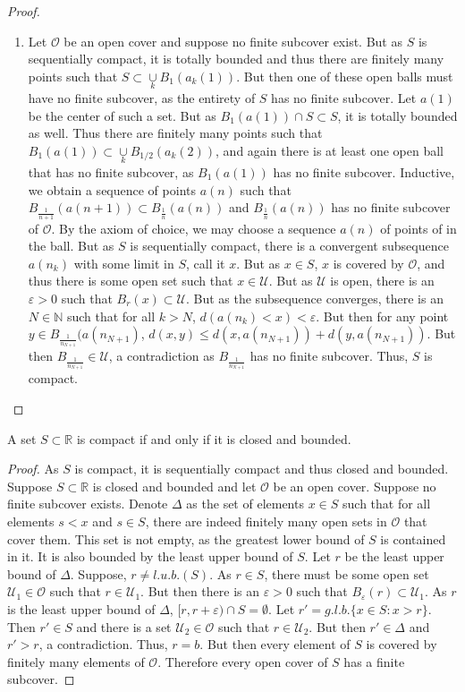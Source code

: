 \documentclass[crop=false,class=book]{standalone}
\begin{document}
\begin{proof}
\begin{enumerate}
\item Let $\mathcal{O}$ be an open cover and suppose no finite subcover exist. But as $S$ is sequentially compact, it is totally bounded and thus there are finitely many points such that $S\subset \underset{k}\cup B_{1}(a_k(1))$. But then one of these open balls must have no finite subcover, as the entirety of $S$ has no finite subcover. Let $a(1)$ be the center of such a set. But as $B_{1}(a(1))\cap S \subset S$, it is totally bounded as well. Thus there are finitely many points such that $B_{1}(a(1))\subset \underset{k}\cup B_{1/2}(a_k(2))$, and again there is at least one open ball that has no finite subcover, as $B_{1}(a(1))$ has no finite subcover. Inductive, we obtain a sequence of points $a(n)$ such that $B_{\frac{1}{n+1}}(a(n+1))\subset B_{\frac{1}{n}}(a(n))$ and $B_{\frac{1}{n}}(a(n))$ has no finite subcover of $\mathcal{O}$. By the axiom of choice, we may choose a sequence $a(n)$ of points of in the ball. But as $S$ is sequentially compact, there is a convergent subsequence $a(n_k)$ with some limit in $S$, call it $x$. But as $x\in S$, $x$ is covered by $\mathcal{O}$, and thus there is some open set such that $x\in \mathcal{U}$. But as $\mathcal{U}$ is open, there is an $\varepsilon>0$ such that $B_{r}(x)\subset \mathcal{U}$. But as the subsequence converges, there is an $N\in \mathbb{N}$ such that for all $k>N$, $d(a(n_k)<x) < \varepsilon$. But then for any point $y\in B_{\frac{1}{n_{N+1}}}(a(n_{N+1})$, $d(x,y) \leq d(x,a(n_{N+1}))+d(y,a(n_{N+1}))$. But then $B_{\frac{1}{n_{N+1}}}\in \mathcal{U}$, a contradiction as $B_{\frac{1}{n_{N+1}}}$ has no finite subcover. Thus, $S$ is compact. 
\end{enumerate}
\end{proof}
\begin{theorem}
A set $S\subset \mathbb{R}$ is compact if and only if it is closed and bounded.
\end{theorem}
\begin{proof}
As $S$ is compact, it is sequentially compact and thus closed and bounded. Suppose $S\subset \mathbb{R}$ is closed and bounded and let $\mathcal{O}$ be an open cover. Suppose no finite subcover exists. Denote $\Delta$ as the set of elements $x\in S$ such that for all elements $s<x$ and $s\in S$, there are indeed finitely many open sets in $\mathcal{O}$ that cover them. This set is not empty, as the greatest lower bound of $S$ is contained in it. It is also bounded by the least upper bound of $S$. Let $r$ be the least upper bound of $\Delta$. Suppose, $r\ne l.u.b.(S)$. As $r\in S$, there must be some open set $\mathcal{U}_1\in \mathcal{O}$ such that $r\in \mathcal{U}_1$. But then there is an $\varepsilon>0$ such that $B_{\varepsilon}(r) \subset \mathcal{U}_1$. As $r$ is the least upper bound of $\Delta$, $[r,r+\varepsilon)\cap S = \emptyset$. Let $r' = g.l.b.\{x\in S: x>r\}$. Then $r'\in S$ and there is a set $\mathcal{U}_2 \in \mathcal{O}$ such that $r\in \mathcal{U}_2$. But then $r' \in \Delta$ and $r'>r$, a contradiction. Thus, $r=b$. But then every element of $S$ is covered by finitely many elements of $\mathcal{O}$. Therefore every open cover of $S$ has a finite subcover.
\end{proof}
\end{document}
